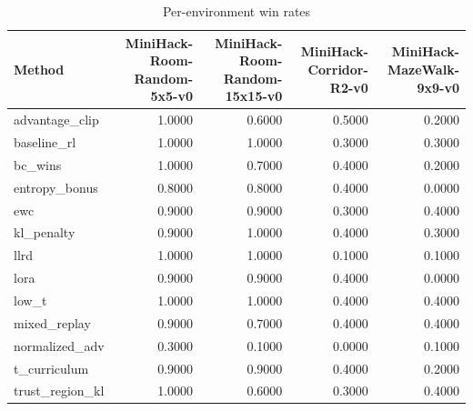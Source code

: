 \begin{table}[htbp]
\centering
\caption{Per-environment win rates}
\label{tab:per-env}
\begin{tabular}{lrrrr}
\toprule
\textbf{Method} & \textbf{MiniHack-Room-Random-5x5-v0} & \textbf{MiniHack-Room-Random-15x15-v0} & \textbf{MiniHack-Corridor-R2-v0} & \textbf{MiniHack-MazeWalk-9x9-v0} \\
\midrule
advantage\_clip & 1.0000 & 0.6000 & 0.5000 & 0.2000 \\
baseline\_rl & 1.0000 & 1.0000 & 0.3000 & 0.3000 \\
bc\_wins & 1.0000 & 0.7000 & 0.4000 & 0.2000 \\
entropy\_bonus & 0.8000 & 0.8000 & 0.4000 & 0.0000 \\
ewc & 0.9000 & 0.9000 & 0.3000 & 0.4000 \\
kl\_penalty & 0.9000 & 1.0000 & 0.4000 & 0.3000 \\
llrd & 1.0000 & 1.0000 & 0.1000 & 0.1000 \\
lora & 0.9000 & 0.9000 & 0.4000 & 0.0000 \\
low\_t & 1.0000 & 1.0000 & 0.4000 & 0.4000 \\
mixed\_replay & 0.9000 & 0.7000 & 0.4000 & 0.4000 \\
normalized\_adv & 0.3000 & 0.1000 & 0.0000 & 0.1000 \\
t\_curriculum & 0.9000 & 0.9000 & 0.4000 & 0.2000 \\
trust\_region\_kl & 1.0000 & 0.6000 & 0.3000 & 0.4000 \\
\bottomrule
\end{tabular}
\end{table}